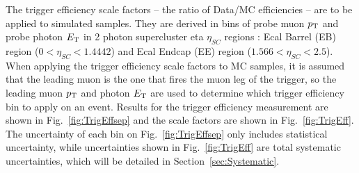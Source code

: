 	The trigger efficiency scale factors -- the ratio of Data/MC	 efficiencies -- are to be applied to simulated samples.  They are derived in bins of probe muon $p_{\mathrm{T}}$ and probe photon $E_{\mathrm{T}}$ in 2 photon supercluster eta $\eta_{SC}$ regions : Ecal Barrel (EB) region ($0 < \eta_{SC} < 1.4442$) and Ecal Endcap (EE) region ($1.566 < \eta_{SC} < 2.5$).  
	When applying the trigger efficiency scale factors to MC samples, it is assumed that the leading muon is the one that fires the muon leg of the trigger, so the leading muon $p_{\mathrm{T}}$ and photon $E_{\mathrm{T}}$ are used to determine which trigger efficiency bin to apply on an event. 
	Results for the trigger efficiency measurement are shown in Fig.~\ref{fig:TrigEffsep} and the scale factors are shown in Fig.~\ref{fig:TrigEff}. The uncertainty of each bin on Fig.~\ref{fig:TrigEffsep} only includes statistical uncertainty, while uncertainties shown in Fig.~\ref{fig:TrigEff} are total systematic uncertainties, which will be detailed in Section~\ref{sec:Systematic}.
		
